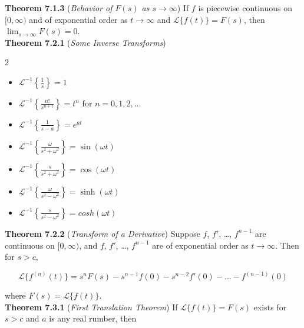 \documentclass[12pt]{article}
\begin{document}
\noindent\textbf{Theorem 7.1.3} (\emph{Behavior of \(F(s)\) as \(s \to \infty\)}) If \(f\) is piecewise continuous on \([0, \infty)\) and of exponential order as \(t \to \infty\) and \(\mathcal{L} \{f(t)\} = F(s)\), then \(\displaystyle\lim_{s \to \infty} F(s) = 0\).\\

\noindent\textbf{Theorem 7.2.1} (\emph{Some Inverse Transforms})

\begin{multicols}{2}
    \begin{itemize}
        \item [(a)] \(\displaystyle\mathcal{L}^{-1} \left\{ \frac{1}{s} \right\} = 1\)
        \item [(b)] \(\displaystyle\mathcal{L}^{-1} \left\{ \frac{n!}{s^{n+1}} \right\} = t^n\) for \(n = 0, 1, 2, \ldots\)
        \item [(c)] \(\displaystyle\mathcal{L}^{-1} \left\{ \frac{1}{s-a} \right\} = e^{at}\)
        \item [(d)] \(\displaystyle\mathcal{L}^{-1} \left\{ \frac{\omega}{s^2 + \omega^2} \right\} = \sin(\omega t)\)
        \item [(e)] \(\displaystyle\mathcal{L}^{-1} \left\{ \frac{s}{s^2 + \omega^2} \right\} = \cos(\omega t)\)
        \item [(f)] \(\displaystyle\mathcal{L}^{-1} \left\{ \frac{\omega}{s^2 - \omega^2} \right\} = \sinh(\omega t)\)
        \item [(g)] \(\displaystyle\mathcal{L}^{-1} \left\{ \frac{s}{s^2 - \omega^2} \right\} = cosh(\omega t)\)
    \end{itemize}
\end{multicols}

\noindent\textbf{Theorem 7.2.2} (\emph{Transform of a Derivative}) Suppose \(f\), \(f'\), \ldots, \(f^{n-1}\) are continuous on \([0, \infty)\), and \(f\), \(f'\), \ldots, \(f^{n-1}\) are of exponential order as \(t \to \infty\). Then for \(s > c\),

\begin{equation}
    \mathcal{L} \{f^{(n)}(t)\} = s^n F(s) - s^{n-1} f(0) - s^{n-2} f'(0) - \ldots - f^{(n-1)}(0)
\end{equation}

\noindent where \(F(s) = \mathcal{L} \{f(t)\}\).\\

\noindent\textbf{Theorem 7.3.1} (\emph{First Translation Theorem}) If \(\mathcal{L} \{f(t)\} = F(s)\) exists for \(s > c\) and \(a\) is any real rumber, then
\end{document}
